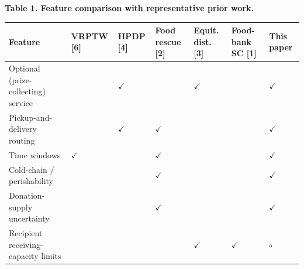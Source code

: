 \documentclass[
  11pt,
]{article}
\newcounter{none} %
\begin{document}
\textbf{Table 1. Feature comparison with representative prior work.}

{\def\LTcaptype{none} %
\begin{longtable}[]{@{}
  >{\raggedright\arraybackslash}p{}
  >{\centering\arraybackslash}p{}
  >{\centering\arraybackslash}p{}
  >{\centering\arraybackslash}p{}
  >{\centering\arraybackslash}p{}
  >{\centering\arraybackslash}p{}
  >{\centering\arraybackslash}p{}@{}}
\toprule\noalign{}
\begin{minipage}[b]{\linewidth}\raggedright
Feature
\end{minipage} & \begin{minipage}[b]{\linewidth}\centering
VRPTW {[}6{]}
\end{minipage} & \begin{minipage}[b]{\linewidth}\centering
HPDP {[}4{]}
\end{minipage} & \begin{minipage}[b]{\linewidth}\centering
Food rescue {[}2{]}
\end{minipage} & \begin{minipage}[b]{\linewidth}\centering
Equit. dist. {[}3{]}
\end{minipage} & \begin{minipage}[b]{\linewidth}\centering
Food-bank SC {[}1{]}
\end{minipage} & \begin{minipage}[b]{\linewidth}\centering
This paper
\end{minipage} \\
\midrule\noalign{}
\endhead
\bottomrule\noalign{}
\endlastfoot
Optional (prize-collecting) service & & $\checkmark$ & & $\checkmark$ & & $\checkmark$ \\
Pickup-and-delivery routing & & $\checkmark$ & $\checkmark$ & & & $\checkmark$ \\
Time windows & $\checkmark$ & & $\checkmark$ & & & $\checkmark$ \\
Cold-chain / perishability & & & $\checkmark$ & & & $\checkmark$ \\
Donation-supply uncertainty & & & $\checkmark$ & & & $\checkmark$ \\
Recipient receiving-capacity limits & & & & $\checkmark$ & $\checkmark$ & $\circ$ \\

\end{longtable}}
\end{document}
